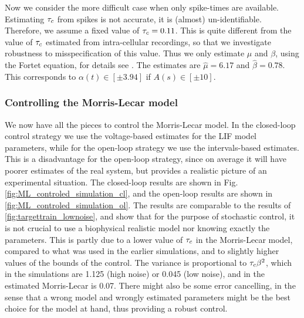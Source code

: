 Now we consider the more difficult case when only spike-times are
available. Estimating $\tau_c$ from spikes is not accurate, it is
(almost) un-identifiable. Therefore, we assume a
fixed value
of $\tau_c=0.11$. This is quite different from the value of $\tau_c$
estimated from intra-cellular recordings, so that we investigate robustness
to misspecification of this value. Thus we only estimate $\mu$ and
$\beta$, using the 
Fortet equation, for details see \cite{Ditlevsen2007}. 
The estimates are $\hat \mu = 6.17$ and $\hat \beta = 0.78$. This
corresponds to $\alpha(t)
\in [\pm 3.94]$ if $A(s) \in [\pm 10]$.

\subsubsection{Controlling the Morris-Lecar model}
\label{sec:controlling_ML}
We now have all the pieces to control the Morris-Lecar model. In the closed-loop control strategy we use the 
voltage-based estimates for the LIF model parameters, while for the
open-loop 
strategy we use the intervals-based estimates. This is a disadvantage
for the open-loop strategy, since on average it will have poorer estimates of the
real system, but provides a realistic picture of an experimental
situation. 
The closed-loop results are shown in Fig. \ref{fig:ML_controled_simulation_cl}, and the open-loop results are
shown in 
\cref{fig:ML_controled_simulation_ol}. The results are comparable to
the results of \cref{fig:targettrain_lownoise}, and show that for
the purpose of stochastic control, it is not crucial to use a
biophysical realistic model nor knowing exactly the parameters. This
is partly due to a lower value of $\tau_c$ in the Morris-Lecar model,
compared to what was used in the earlier simulations, and to slightly higher
values of the bounds of the control. The variance is
proportional to $\tau_c \beta^2$, which in the simulations are 1.125
(high noise) or 0.045 (low noise), and in the estimated Morris-Lecar
is 0.07.  There might also be some error cancelling, in the sense that
a wrong model and 
wrongly estimated parameters might be the best choice for
the model at hand, thus providing a robust control.

